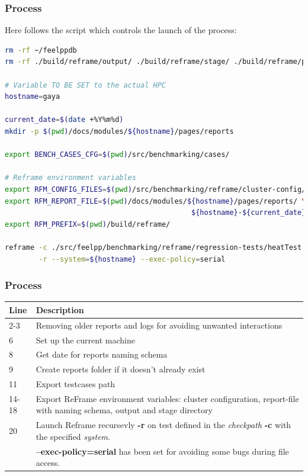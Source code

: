 \documentclass[10pt]{beamer}
\begin{document}
\begin{frame}[fragile]
    \frametitle{\textbf{Process}}
    Here follows the script which controls the launch of the process:
    \vspace{0.5cm}

\begin{lstlisting}[language=bash,caption={Script for process launching}]
rm -rf ~/feelppdb
rm -rf ./build/reframe/output/ ./build/reframe/stage/ ./build/reframe/perflogs

# Variable TO BE SET to the actual HPC
hostname=gaya

current_date=$(date +%Y%m%d)
mkdir -p $(pwd)/docs/modules/${hostname}/pages/reports

export BENCH_CASES_CFG=$(pwd)/src/benchmarking/cases/

# Reframe environment variables
export RFM_CONFIG_FILES=$(pwd)/src/benchmarking/reframe/cluster-config/${hostname}.py
export RFM_REPORT_FILE=$(pwd)/docs/modules/${hostname}/pages/reports/ \
                                            ${hostname}-${current_date}-{sessionid}.json
export RFM_PREFIX=$(pwd)/build/reframe/

reframe -c ./src/feelpp/benchmarking/reframe/regression-tests/heatTest.py \
        -r --system=${hostname} --exec-policy=serial
\end{lstlisting}

\end{frame}

\begin{frame}
    \frametitle{\textbf{Process}}
    \small
    \begin{tabular}{|l|m{8.5cm}|}
        \hline
        \textbf{Line} & \textbf{Description} \\
        \hline
        2-3  & Removing older reports and logs for avoiding unwanted interactions \\
        \hline
        6    & Set up the current machine \\
        \hline
        8    & Get date for reports naming schema \\
        \hline
        9    & Create reports folder if it doesn't already exist \\
        \hline
        11   & Export testcases path \\
        \hline
        14-18   & Export ReFrame environment variables: cluster configuration, report-file with naming schema, output and stage directory\\
        \hline
        20   & Launch Reframe recursevly \textbf{-r} on test defined in the \textit{checkpath} \textbf{-c} with the specified \textit{system}.\\
             & \textbf{--exec-policy=serial} has been set for avoiding some bugs during file access. \\
        \hline
    \end{tabular}
\end{frame}
\end{document}
